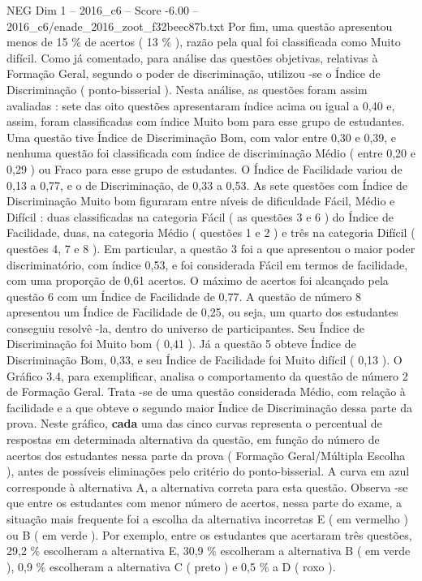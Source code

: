\begin{textsample}{NEG Dim 1 – 2016\_c6 – Score -6.00 – 2016\_c6/enade\_2016\_zoot\_f32beec87b.txt}
Por fim, uma questão apresentou menos de 15 \% de acertos ( 13 \% ), razão pela qual foi classificada como Muito difícil.
Como já comentado, para análise das questões objetivas, relativas à Formação Geral, segundo o poder de discriminação, utilizou -se o Índice de Discriminação ( ponto-bisserial ).
Nesta análise, as questões foram assim avaliadas : sete das oito questões apresentaram índice acima ou igual a 0,40 e, assim, foram classificadas com índice Muito bom para esse grupo de estudantes.
Uma questão tive Índice de Discriminação Bom, com valor entre 0,30 e 0,39, e nenhuma questão foi classificada com índice de discriminação Médio ( entre 0,20 e 0,29 ) ou Fraco para esse grupo de estudantes.
O Índice de Facilidade variou de 0,13 a 0,77, e o de Discriminação, de 0,33 a 0,53.
As sete questões com Índice de Discriminação Muito bom figuraram entre níveis de dificuldade Fácil, Médio e Difícil : duas classificadas na categoria Fácil ( as questões 3 e 6 ) do Índice de Facilidade, duas, na categoria Médio ( questões 1 e 2 ) e três na categoria Difícil ( questões 4, 7 e 8 ).
Em particular, a questão 3 foi a que apresentou o maior poder discriminatório, com índice 0,53, e foi considerada Fácil em termos de facilidade, com uma proporção de 0,61 acertos.
O máximo de acertos foi alcançado pela questão 6 com um Índice de Facilidade de 0,77.
A questão de número 8 apresentou um Índice de Facilidade de 0,25, ou seja, um quarto dos estudantes conseguiu resolvê -la, dentro do universo de participantes.
Seu Índice de Discriminação foi Muito bom ( 0,41 ).
Já a questão 5 obteve Índice de Discriminação Bom, 0,33, e seu Índice de Facilidade foi Muito difícil ( 0,13 ).
O Gráfico 3.4, para exemplificar, analisa o comportamento da questão de número 2 de Formação Geral.
Trata -se de uma questão considerada Médio, com relação à facilidade e a que obteve o segundo maior Índice de Discriminação dessa parte da prova.
Neste gráfico, \textbf{cada} uma das cinco curvas representa o percentual de respostas em determinada alternativa da questão, em função do número de acertos dos estudantes nessa parte da prova ( Formação Geral/Múltipla Escolha ), antes de possíveis eliminações pelo critério do ponto-bisserial.
A curva em azul corresponde à alternativa A, a alternativa correta para esta questão.
Observa -se que entre os estudantes com menor número de acertos, nessa parte do exame, a situação mais frequente foi a escolha da alternativa incorretas E ( em vermelho ) ou B ( em verde ).
Por exemplo, entre os estudantes que acertaram três questões, 29,2 \% escolheram a alternativa E, 30,9 \% escolheram a alternativa B ( em verde ), 0,9 \% escolheram a alternativa C ( preto ) e 0,5 \% a D ( roxo ).

\end{textsample}
